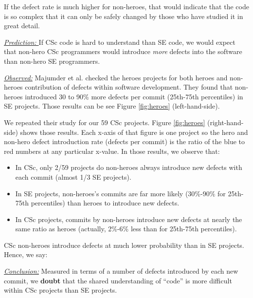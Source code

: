 \documentclass[conference,10pt]{IEEEtran}
\newcommand{\bi}{\begin{itemize}}
\newcommand{\ei}{\end{itemize}}
\newenvironment{RQ}{\vspace{1mm}\begin{tcolorbox}[enhanced,width=3.4in,size=fbox,colback=red!5!white,drop shadow southeast,sharp corners]}{\end{tcolorbox}}
\begin{document}
If the defect rate is much higher for non-heroes, that would
indicate that the code is so complex that it can only
be safely changed by those who have studied it in great detail.


\noindent \textit{\underline{Prediction: }} If CSc code is hard to understand than SE code, we would expect that non-hero CSc programmers would
introduce {\em more} defects into the software than non-hero SE programmers. 




\noindent \textit{\underline{Observed:}} Majumder et al. \cite{majumder19_heroes} checked the heroes projects for both heroes and non-heroes contribution of defects within software development. They found that non-heroes introduced 30 to 90\% more defects per commit (25th-75th percentiles) in SE projects. Those
results can be see Figure \ref{fig:heroes} (left-hand-side).

We repeated their study for our 59 CSc projects.  Figure \ref{fig:heroes} (right-hand-side)
shows those results. Each x-axis of that figure is one project so the hero and non-hero defect introduction rate (defects per commit) is the ratio of the blue to red numbers
at any particular x-value.
In those results, we observe that:
\bi
\item In CSc, only 2/59 projects do non-heroes always introduce new defects with each commit (almost 1/3 SE projects).
\item In SE projects, non-heroes's commits are far more likely (30\%-90\% for 25th-75th percentiles) than heroes to introduce new defects.
\item In CSc projects, commits by non-heroes introduce new defects at nearly the same ratio as heroes (actually, 2\%-6\% less than for 25th-75th percentiles).
\ei
 
CSc non-heroes introduce defects at much lower probability than in SE projects. Hence, we say:

\begin{RQ}
\textit{\underline{Conclusion:}} Measured in terms
of a number of defects introduced by each new commit, we \textbf{doubt} that the shared understanding of ``code'' is more difficult within  CSc projects than SE projects.
\end{RQ}
\end{document}
